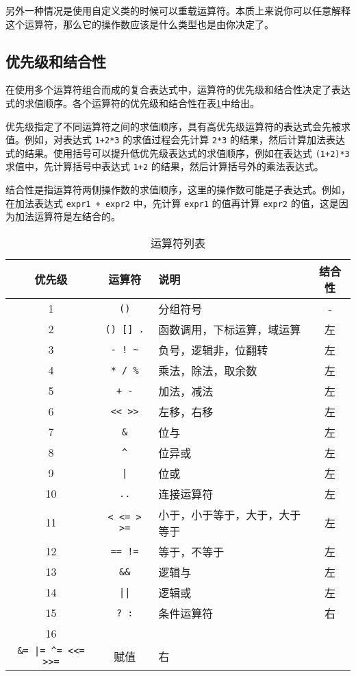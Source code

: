 另外一种情况是使用自定义类的时候可以重载运算符。本质上来说你可以任意解释这个运算符，那么它的操作数应该是什么类型也是由你决定了。

\subsection{优先级和结合性}

在使用多个运算符组合而成的复合表达式中，运算符的优先级和结合性决定了表达式的求值顺序。各个运算符的优先级和结合性在表\ref{tab::operator_list}中给出。

优先级指定了不同运算符之间的求值顺序，具有高优先级运算符的表达式会先被求值。例如，对表达式 \texttt{1+2*3} 的求值过程会先计算 \texttt{2*3} 的结果，然后计算加法表达式的结果。使用括号可以提升低优先级表达式的求值顺序，例如在表达式 \texttt{(1+2)*3} 求值中，先计算括号中表达式 \texttt{1+2} 的结果，然后计算括号外的乘法表达式。

结合性是指运算符两侧操作数的求值顺序，这里的操作数可能是子表达式。例如，在加法表达式 \texttt{expr1 + expr2} 中，先计算 \texttt{expr1} 的值再计算 \texttt{expr2} 的值，这是因为加法运算符是左结合的。

\begin{table}[htb]
    \centering
    \setlength{\tabcolsep}{3mm}
    \begin{tabular}{cclc} \toprule
        \textbf{优先级} & \textbf{运算符} & \textbf{说明} & \textbf{结合性} \\ \midrule
        1 & \texttt{()} & 分组符号 & - \\
        2 & \texttt{() [] .} & 函数调用，下标运算，域运算 & 左 \\
        3 & \texttt{- ! \textasciitilde} & 负号，逻辑非，位翻转 & 左 \\
        4 & \texttt{* / \%} & 乘法，除法，取余数 & 左 \\
        5 & \texttt{+ -} & 加法，减法 & 左 \\
        6 & \texttt{<< >>} & 左移，右移 & 左 \\
        7 & \texttt{\&} & 位与 & 左 \\
        8 & \texttt{\textasciicircum} & 位异或 & 左 \\
        9 & \texttt{|} & 位或 & 左 \\
        10 & \texttt{..} & 连接运算符 & 左 \\
        11 & \texttt{< <= > >=} & 小于，小于等于，大于，大于等于 & 左 \\
        12 & \texttt{== !=} & 等于，不等于 & 左 \\
        13 & \texttt{\&\&} & 逻辑与 & 左 \\
        14 & \texttt{||} & 逻辑或 & 左 \\
        15 & \texttt{? :} & 条件运算符 & 右 \\
        16 & \makecell{\texttt{= += -= *= /= \%=} \\
                       \texttt{\&= |= \textasciicircum= <<= >>=}} & 赋值 & 右 \\
        \bottomrule
    \end{tabular}
    \caption{运算符列表}
    \label{tab::operator_list}
\end{table}

